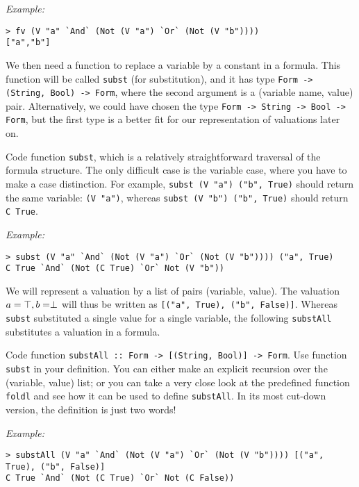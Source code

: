 \documentclass[english]{article}
\begin{document}
\noindent
\emph{Example:}
\begin{lstlisting}
> fv (V "a" `And` (Not (V "a") `Or` (Not (V "b"))))
["a","b"]
\end{lstlisting}


We then need a function to replace a variable by a constant in a formula. This
function will be called \texttt{subst} (for substitution), and it has type
\texttt{Form -> (String, Bool) -> Form}, where the second argument is a
(variable name, value) pair. Alternatively, we could have chosen the type
\texttt{Form -> String -> Bool -> Form}, but the first type is a better fit
for our representation of valuations later on.

\begin{exo}\label{exo:subst}
Code function \texttt{subst}, which is a relatively straightforward traversal
of the formula structure. The only difficult case is the variable case, where
you have to make a case distinction. For
example, \texttt{subst (V "a") ("b", True)} should return the same variable:
\texttt{(V "a")}, whereas \texttt{subst (V "b") ("b", True)} should return
\texttt{C True}. 
\end{exo}

\noindent
\emph{Example:}
\begin{lstlisting}
> subst (V "a" `And` (Not (V "a") `Or` (Not (V "b")))) ("a", True)
C True `And` (Not (C True) `Or` Not (V "b"))
\end{lstlisting}

We will represent a valuation by a list of pairs (variable, value). The
valuation $a=\top, b=\perp$ will thus be written as \texttt{[("a", True),
  ("b", False)]}. Whereas \texttt{subst} substituted a single value for a
single variable, the following \texttt{substAll} substitutes a valuation in a
formula.

\begin{exo}\label{sec:substAll}
Code function \texttt{substAll :: Form -> [(String, Bool)] -> Form}. Use
function \texttt{subst} in your definition. You can either make an explicit
recursion over the (variable, value) list; or you can take a very close look
at the predefined function \texttt{foldl} and see how it can be used to define
\texttt{substAll}. In its most cut-down version, the definition is just two words!
\end{exo}

\noindent
\emph{Example:}
\begin{lstlisting}
> substAll (V "a" `And` (Not (V "a") `Or` (Not (V "b")))) [("a", True), ("b", False)]
C True `And` (Not (C True) `Or` Not (C False))
\end{lstlisting}
\end{document}
